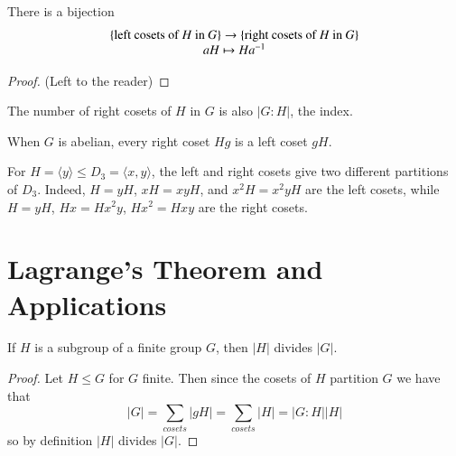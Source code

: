 \documentclass[12pt, a4paper, oneside, openright, titlepage]{book}
\begin{document}
\begin{prop}
        There is a bijection \begin{equation}
                \begin{array}{c} \{\text{left cosets of $H$ in $G$}\}\rightarrow \{\text{right cosets of $H$ in $G$}\} \\ aH \mapsto Ha^{-1} \end{array}
        \end{equation}
\end{prop}
\begin{proof}
        (Left to the reader)
\end{proof}

\begin{cor}
        The number of right cosets of $H$ in $G$ is also $|G:H|$, the index.
\end{cor}


\begin{rmk}
        When $G$ is abelian, every right coset $Hg$ is a left coset $gH$.
\end{rmk}

\begin{eg}
        For $H = \langle y \rangle \leq D_3 = \langle x,y\rangle$, the left and right cosets give two different partitions of $D_3$. Indeed, $H = yH$, $xH = xyH$, and $x^2H = x^2yH$ are the left cosets, while $H = yH$, $Hx = Hx^2y$, $Hx^2 = Hxy$ are the right cosets.
\end{eg}


\section{\textsection Lagrange's Theorem and Applications}

\begin{namthm}\label{thmname:lagrange}
        If $H$ is a subgroup of a finite group $G$, then $|H|$ divides $|G|$.
\end{namthm}
\begin{proof}
        Let $H\leq G$ for $G$ finite. Then since the cosets of $H$ partition $G$ we have that \begin{equation}
                |G| = \sum\limits_{cosets}|gH| = \sum\limits_{cosets}|H| = |G:H||H|
        \end{equation}
        so by definition $|H|$ divides $|G|$.
\end{proof}
\end{document}
